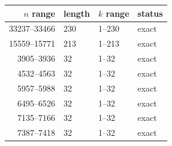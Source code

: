 \begin{tabular}{rlll}
\toprule
$n$ range & length & $k$ range & status \\
\midrule
33237--33466 & 230 & 1--230 & exact \\
15559--15771 & 213 & 1--213 & exact \\
3905--3936 & 32 & 1--32 & exact \\
4532--4563 & 32 & 1--32 & exact \\
5957--5988 & 32 & 1--32 & exact \\
6495--6526 & 32 & 1--32 & exact \\
7135--7166 & 32 & 1--32 & exact \\
7387--7418 & 32 & 1--32 & exact \\
\bottomrule
\end{tabular}
